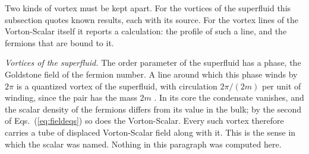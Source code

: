 Two kinds of vortex must be kept apart. For the vortices of the superfluid this subsection quotes
known results, each with its source. For the vortex lines of the Vorton-Scalar itself it reports a
calculation: the profile of such a line, and the fermions that are bound to it.

\emph{Vortices of the superfluid.} The order parameter of the superfluid has a phase, the Goldstone
field of the fermion number. A line around which this phase winds by $2\pi$ is a quantized vortex of
the superfluid, with circulation $2\pi/(2m)$ per unit of winding, since the pair has the mass $2m$
\cite{Onsager1949,Feynman1955}. In its core the condensate vanishes, and the scalar density of the
fermions differs from its value in the bulk; by the second of Eqs.~(\ref{eq:fieldeqs}) so does the
Vorton-Scalar. Every such vortex therefore carries a tube of displaced Vorton-Scalar field along with
it. This is the sense in which the scalar was named. Nothing in this paragraph was computed here.


